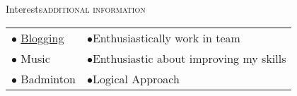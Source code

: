 \documentclass[letterpaper,10.9pt]{article}
\newcommand{\shortersection}[2]{\vspace{11pt}\scshape\raggedright\large{\color{black}\titlerule \vspace{-10pt}#1}\hfill\scshape\large{#2}}
\begin{document}

\shortersection{Interests}{additional information}

\vspace{6pt}
\begin{tabular}{p{13cm} p}
\small
$\bullet$ \color{blue}\href{https://medium.com/@sanchittanwar75}{Blogging} & 
\small
$\bullet$\hspace{2pt}Enthusiastically work in team\hfill \\
\small
$\bullet$ Music & 
\small
$\bullet$\hspace{2pt}Enthusiastic about improving my skills\hfill \\
\small
$\bullet$ Badminton & 
\small
 $\bullet$\hspace{2pt}Logical Approach\hfill
\end{tabular}
\end{document}
